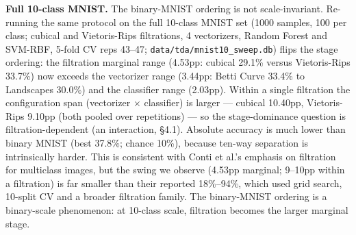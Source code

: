 \documentclass[12pt, a4paper]{report}
\theoremstyle{definition}
\theoremstyle{plain}
\theoremstyle{remark}
\begin{document}
\textbf{Full 10-class MNIST.} The binary-MNIST ordering is not
scale-invariant. Re-running the same protocol on the full 10-class MNIST
set (1000 samples, 100 per class; cubical and Vietoris-Rips filtrations,
4 vectorizers, Random Forest and SVM-RBF, 5-fold CV reps 43--47;
\texttt{data/tda/mnist10\_sweep.db}) flips the stage ordering: the
filtration marginal range (4.53pp: cubical 29.1\% versus Vietoris-Rips
33.7\%) now exceeds the vectorizer range (3.44pp: Betti Curve 33.4\% to
Landscapes 30.0\%) and the classifier range (2.03pp). Within a single
filtration the configuration span (vectorizer $\times$ classifier) is
larger --- cubical 10.40pp, Vietoris-Rips 9.10pp (both pooled over
repetitions) --- so the stage-dominance question is
filtration-dependent (an interaction, \S4.1). Absolute accuracy is
much lower than binary MNIST (best 37.8\%; chance 10\%), because
ten-way separation is intrinsically harder. This is consistent with
Conti et al.'s emphasis on filtration for multiclass images, but the
swing we observe (4.53pp marginal; 9--10pp within a filtration) is far
smaller than their reported 18\%--94\%, which used grid search,
10-split CV and a broader filtration family. The
binary-MNIST ordering is a binary-scale
phenomenon: at 10-class scale, filtration becomes the larger marginal
stage.
\end{document}
